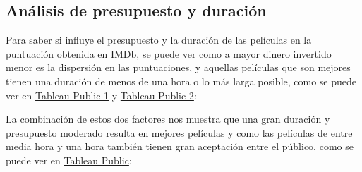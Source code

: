 \documentclass{article}
\begin{document}
\clearpage

\subsection{Análisis de presupuesto y duración}

Para saber si influye el presupuesto y la duración de las películas en la puntuación obtenida en IMDb, se puede ver como a mayor dinero invertido menor es la dispersión en las puntuaciones, y aquellas películas que son mejores tienen una duración de menos de una hora o lo más larga posible, como se puede ver en \href{https://public.tableau.com/profile/javier6580\#!/vizhome/proyecto_fin_de_master_dataset/rating_budget}{Tableau Public 1} y \href{https://public.tableau.com/profile/javier6580\#!/vizhome/proyecto_fin_de_master_dataset/rating_budget}{Tableau Public 2}:

\begin{figure}[h]
\centering
{}
\end{figure}

La combinación de estos dos factores nos muestra que una gran duración y presupuesto moderado resulta en mejores películas y como las películas de entre media hora y una hora también tienen gran aceptación entre el público, como se puede ver en \href{https://public.tableau.com/profile/javier6580\#!/vizhome/proyecto_fin_de_master_dataset/budget_duration}{Tableau Public}:
\end{document}
